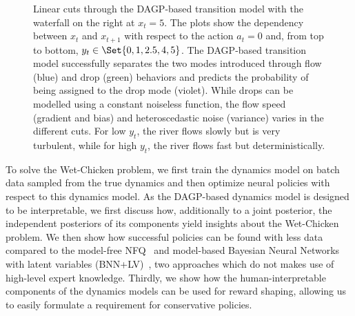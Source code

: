 \begin{figure}[tp]
    \centering
    
    
    
    
    
    \vspace*{-5pt} %
    \caption{
        \label{fig:interpretable_rl:wetchicken:cut}
        Linear cuts through the DAGP-based transition model with the waterfall on the right at $x_t = 5$.
        The plots show the dependency between $x_t$ and $x_{t+1}$ with respect to the action $a_t = 0$ and, from top to bottom, $y_t \in \Set{0, 1, 2.5, 4, 5}$.
        The DAGP-based transition model successfully separates the two modes introduced through flow (blue) and drop (green) behaviors and predicts the probability of being assigned to the drop mode (violet).
        While drops can be modelled using a constant noiseless function, the flow speed (gradient and bias) and heteroscedastic noise (variance) varies in the different cuts.
        For low $y_t$, the river flows slowly but is very turbulent, while for high $y_t$, the river flows fast but deterministically.
    }
\end{figure}
To solve the Wet-Chicken problem, we first train the dynamics model on batch data sampled from the true dynamics and then optimize neural policies with respect to this dynamics model.
As the DAGP-based dynamics model is designed to be interpretable, we first discuss how, additionally to a joint posterior, the independent posteriors of its components yield insights about the Wet-Chicken problem.
We then show how successful policies can be found with less data compared to the model-free NFQ~\parencite{riedmiller_neural_2005} and model-based Bayesian Neural Networks with latent variables (BNN+LV)~\parencite{depeweg_learning_2016}, two approaches which do not makes use of high-level expert knowledge.
Thirdly, we show how the human-interpretable components of the dynamics models can be used for reward shaping, allowing us to easily formulate a requirement for conservative policies.


